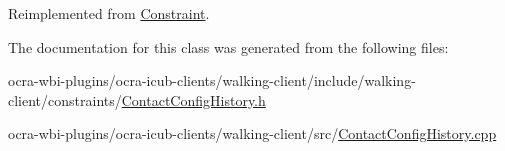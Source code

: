 \-Reimplemented from \hyperlink{classConstraint_a07453509c3f0f95034db965c9e699810}{\-Constraint}.



\-The documentation for this class was generated from the following files\-:\begin{DoxyCompactItemize}
\item 
ocra-\/wbi-\/plugins/ocra-\/icub-\/clients/walking-\/client/include/walking-\/client/constraints/\hyperlink{ContactConfigHistory_8h}{\-Contact\-Config\-History.\-h}\item 
ocra-\/wbi-\/plugins/ocra-\/icub-\/clients/walking-\/client/src/\hyperlink{ContactConfigHistory_8cpp}{\-Contact\-Config\-History.\-cpp}\end{DoxyCompactItemize}
